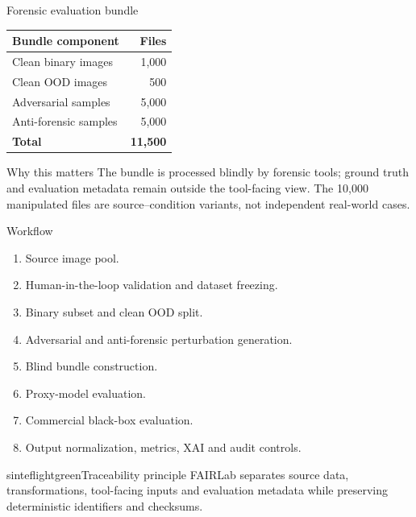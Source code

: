 \documentclass{beamer}
\begin{document}
\begin{frame}{Forensic evaluation bundle}

\begin{table}
\centering
\small
\begin{tabular}{@{}lr@{}}
\toprule
\textbf{Bundle component} & \textbf{Files} \\
\midrule
Clean binary images & 1,000 \\
Clean OOD images & 500 \\
Adversarial samples & 5,000 \\
Anti-forensic samples & 5,000 \\
\midrule
\textbf{Total} & \textbf{11,500} \\
\bottomrule
\end{tabular}
\end{table}

\begin{block}{Why this matters}
The bundle is processed blindly by forensic tools; ground truth and evaluation metadata remain outside the tool-facing view. The 10,000 manipulated files are source--condition variants, not independent real-world cases.
\end{block}

\end{frame}


\begin{frame}[shrink=2]{Workflow}

\small

\begin{enumerate}
    \item Source image pool.
    \item Human-in-the-loop validation and dataset freezing.
    \item Binary subset and clean OOD split.
    \item Adversarial and anti-forensic perturbation generation.
    \item Blind bundle construction.
    \item Proxy-model evaluation.
    \item Commercial black-box evaluation.
    \item Output normalization, metrics, XAI and audit controls.
\end{enumerate}

\begin{colorblock}[black]{sinteflightgreen}{Traceability principle}
FAIRLab separates source data, transformations, tool-facing inputs and evaluation metadata while preserving deterministic identifiers and checksums.
\end{colorblock}

\end{frame}
\end{document}
